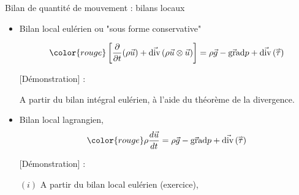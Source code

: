 \begin{frame}{Bilan de quantité de mouvement : bilans locaux}

\small


\medskip
\pause

\begin{itemize}
\item
  Bilan local eulérien ou "sous forme conservative"

	\begin{equation}
		\color{rouge}
		\left[ \dpdt{} (\rho \myvec{u}) +  \myvec{\divergence}(\rho \myvec{u} \otimes \myvec{u}) \right] 
		= \rho \myvec{g} - \gradient p + \myvec{\divergence}( \mytensor{\tau} )
		\label{eq:bilan_local_eulerien_qdm}
	\end{equation}

\pause 
\medskip

{\color{vert} [Démonstration] :}

 A partir du bilan intégral eulérien, à l'aide du théorème de la divergence.

\pause
\medskip

\item
	Bilan local lagrangien, 
	\begin{equation}
	\color{rouge}
		\rho \ddt{\myvec{u}} 
		= 
		\rho \myvec{g}  - \gradient p + \myvec{\divergence}( \mytensor{\tau})
	\end{equation}
	
	\medskip

\pause
\medskip

{\color{vert} [Démonstration] :}

$(i)$ A partir du bilan local eulérien (exercice), 


\end{itemize}
\end{frame}
